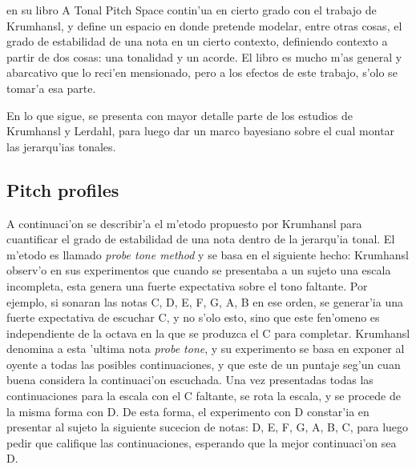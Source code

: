 

\cite{Lerdahl2001} en su libro A Tonal Pitch Space contin'ua en cierto grado con el trabajo de Krumhansl, y define un espacio en donde pretende 
modelar, entre otras cosas, el grado de estabilidad de una nota en un cierto contexto, definiendo contexto a partir de dos cosas: una tonalidad y un acorde. 
El libro es mucho m'as general y abarcativo que lo reci'en mensionado, pero a los efectos de este trabajo, s'olo se tomar'a esa parte.

En lo que sigue, se presenta con mayor detalle parte de los estudios de Krumhansl y Lerdahl, para luego dar un marco bayesiano sobre el cual montar las jerarqu'ias tonales.

\subsection{Pitch profiles}
\label{sec:pitch_profile}
A continuaci'on se describir'a el m'etodo propuesto por Krumhansl para cuantificar el grado de estabilidad de una nota dentro de la jerarqu'ia tonal. 
El m'etodo es llamado \emph{probe tone method} y se basa en el siguiente hecho: Krumhansl observ'o en sus experimentos que cuando se presentaba a un sujeto una escala 
incompleta, esta genera una fuerte expectativa sobre el tono faltante. Por ejemplo, si sonaran las notas C, D, E, F, G, A, B en ese orden, se generar'ia una fuerte 
expectativa de escuchar C, y no s'olo esto, sino que este fen'omeno es independiente de la octava en la que se produzca el C para completar.
Krumhansl denomina a esta 'ultima nota \emph{probe tone}, y su experimento se basa en exponer al oyente a todas las posibles continuaciones, y que este de un puntaje
seg'un cuan buena considera la continuaci'on escuchada. Una vez presentadas todas las continuaciones para la escala con el C faltante, se rota la escala, y se procede
de la misma forma con D. De esta forma, el experimento con D constar'ia en presentar al sujeto la siguiente sucecion de notas: D, E, F, G, A, B, C, para luego pedir
que califique las continuaciones, esperando que la mejor continuaci'on sea D.

